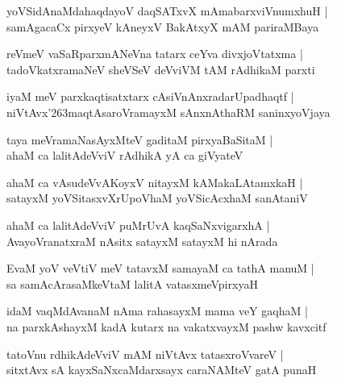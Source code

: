 \documentclass[twoside,12pt,openright]{book}
\def\S{\char'263}
\newcounter{shloka}[chapter]
\begin{document}
\begin{shloka}%
yoVSidAnaMdahaqdayoV daqSATxvX mAmabarxviVnumxhuH |\\
samAgacaCx pirxyeV kAneyxV BakAtxyX mAM pariraMBaya
\end{shloka}

\begin{shloka}%
reVmeV vaSaRparxmANeVna tatarx ceYva divxjoVtatxma |\\
tadoVkatxramaNeV sheVSeV deVviVM tAM rAdhikaM parxti
\end{shloka}

\begin{shloka}%
iyaM meV parxkaqtisatxtarx cAsiVnAnxradarUpadhaqtf |\\
niVtAvx\S maqtAsaroVramayxM sAnxnAthaRM saninxyoVjaya
\end{shloka}

\begin{shloka}%
taya meVramaNasAyxMteV gaditaM pirxyaBaSitaM |\\
ahaM ca lalitAdeVviV rAdhikA yA ca giVyateV 
\end{shloka}

\begin{shloka}%
ahaM ca vAsudeVvAKoyxV nitayxM kAMakaLAtamxkaH |\\
satayxM yoVSitasxvXrUpoVhaM yoVSicAcxhaM sanAtaniV 
\end{shloka}

\begin{shloka}%
ahaM ca lalitAdeVviV puMrUvA kaqSaNxvigarxhA |\\
AvayoVranatxraM nAsitx satayxM satayxM hi nArada
\end{shloka}

\begin{shloka}%
EvaM yoV veVtiV meV tatavxM samayaM ca tathA manuM |\\
sa samAcArasaMkeVtaM lalitA vatasxmeVpirxyaH 
\end{shloka}

\begin{shloka}%
idaM vaqMdAvanaM nAma rahasayxM mama veY gaqhaM |\\
na parxkAshayxM kadA kutarx na vakatxvayxM pashw kavxcitf 
\end{shloka}

\begin{shloka}%
tatoVnu rdhikAdeVviV mAM niVtAvx tatasxroVvareV |\\
sitxtAvx sA kayxSaNxcaMdarxsayx caraNAMteV gatA punaH 
\end{shloka}
\end{document}
